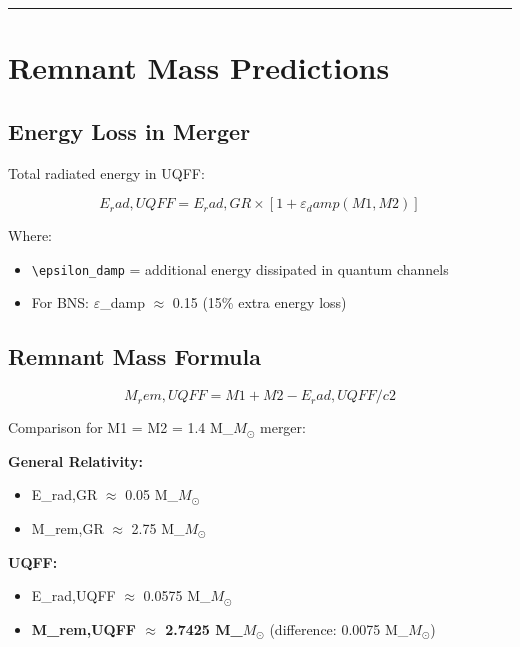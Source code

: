 \documentclass[12pt,a4paper]{article}
\begin{document}
\medskip\hrule\medskip

\section{Remnant Mass Predictions}

\subsection{Energy Loss in Merger}

Total radiated energy in UQFF:

\begin{equation}
E_rad,UQFF = E_rad,GR \times [1 + \varepsilon_damp(M1,M2)]
\end{equation}

Where:

\begin{itemize}
  \item \texttt{\textbackslash epsilon\_damp} = additional energy dissipated in quantum channels
  \item For BNS: $\varepsilon$\_damp $\approx$ 0.15 (15\% extra energy loss)
\end{itemize}

\subsection{Remnant Mass Formula}

\begin{equation}
M_rem,UQFF = M1 + M2 - E_rad,UQFF/c2
\end{equation}

Comparison for M1 = M2 = 1.4 M\_{$M_{\odot}$} merger:

\textbf{General Relativity:}

\begin{itemize}
  \item E\_rad,GR $\approx$ 0.05 M\_{$M_{\odot}$}
  \item M\_rem,GR $\approx$ 2.75 M\_{$M_{\odot}$}
\end{itemize}

\textbf{UQFF:}

\begin{itemize}
  \item E\_rad,UQFF $\approx$ 0.0575 M\_{$M_{\odot}$}
  \item \textbf{M\_rem,UQFF $\approx$ 2.7425 M\_{$M_{\odot}$}} (difference: 0.0075 M\_{$M_{\odot}$})
\end{itemize}
\end{document}
